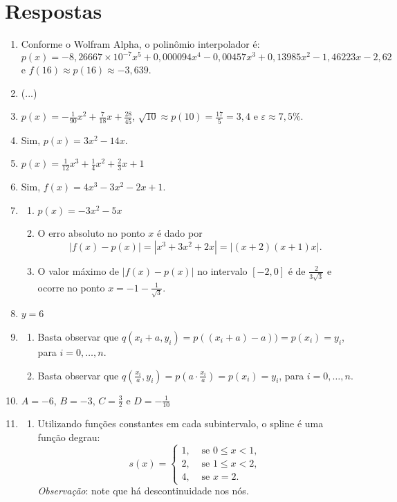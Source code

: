 \documentclass[12pt,a4paper]{article}
\newcommand{\fixme}{{\color{red}(...)}}
\begin{document}
\section*{Respostas}
\begin{enumerate}
\item Conforme o Wolfram Alpha, o polinômio interpolador é:
\[
p(x) = -8,\!26667 \times 10^{-7} x^5 + 0,\!000094 x^4 - 0,\!00457 x^3 + 0,\!13985 x^2 - 1,\!46223 x - 2,\!62
\]
e $f(16) \approx p(16) \approx -3,\!639$.
\item \fixme
\item $p(x) = -\frac{1}{90}x^2 + \frac{7}{18} x + \frac{28}{45}$, $\sqrt{10} \approx p(10) = \frac{17}{5} = 3,\!4$ e $\varepsilon \approx 7,\!5\%$.
\item Sim, $p(x) = 3x^2 - 14x$.
\item $p(x) = \frac{1}{12}x^3 + \frac{1}{4}x^2 + \frac{2}{3} x + 1$
\item Sim, $f(x) = 4x^3 - 3x^2 - 2x + 1$.
\item
\begin{enumerate}
\item $p(x) = -3x^2 - 5x$
\item O erro absoluto no ponto $x$ é dado por
\[
|f(x) - p(x)| = |x^3 + 3x^2 + 2x| = |(x + 2) (x + 1) x|.
\]

\item O valor máximo de $|f(x) - p(x)|$ no intervalo $[-2, 0]$ é de $\frac{2}{3 \sqrt{3}}$ e ocorre no ponto $x = -1 - \frac{1}{\sqrt{3}}$.
\end{enumerate}
\item $y=6$
\item
\begin{enumerate}
\item Basta observar que $q(x_i + a, y_i) = p((x_i + a)-a)) = p(x_i) = y_i$, para $i = 0, \ldots, n$.
\item Basta observar que $q(\frac{x_i}{a}, y_i) = p(a \cdot \frac{x_i}{a}) = p(x_i) = y_i$, para $i = 0, \ldots, n$.
\end{enumerate}

\item $A = -6$, $B = -3$, $C = \frac{3}{2}$ e $D = -\frac{1}{10}$
\item
\begin{enumerate}
\item Utilizando funções constantes em cada subintervalo, o spline é uma função degrau:
\[
s(x) =
\begin{cases}
1, & \text{ se } 0\leq x < 1, \\
2, & \text{ se } 1\leq x < 2, \\
4, & \text{ se } x = 2.
\end{cases}
\]
\textit{Observação}: note que há descontinuidade nos nós.


\end{enumerate}
\end{enumerate}
\end{document}
